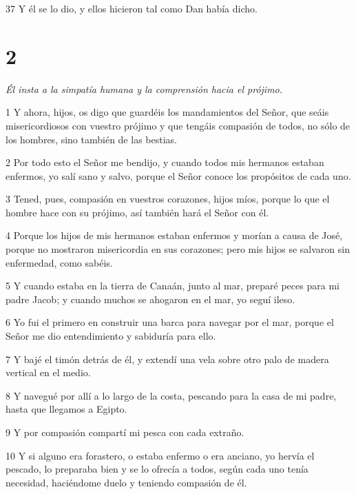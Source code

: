 \par 37 Y él se lo dio, y ellos hicieron tal como Dan había dicho.

\chapter{2}

\par \textit{Él insta a la simpatía humana y la comprensión hacia el prójimo.}

\par 1 Y ahora, hijos, os digo que guardéis los mandamientos del Señor, que seáis misericordiosos con vuestro prójimo y que tengáis compasión de todos, no sólo de los hombres, sino también de las bestias.

\par 2 Por todo esto el Señor me bendijo, y cuando todos mis hermanos estaban enfermos, yo salí sano y salvo, porque el Señor conoce los propósitos de cada uno.

\par 3 Tened, pues, compasión en vuestros corazones, hijos míos, porque lo que el hombre hace con su prójimo, así también hará el Señor con él.

\par 4 Porque los hijos de mis hermanos estaban enfermos y morían a causa de José, porque no mostraron misericordia en sus corazones; pero mis hijos se salvaron sin enfermedad, como sabéis.

\par 5 Y cuando estaba en la tierra de Canaán, junto al mar, preparé peces para mi padre Jacob; y cuando muchos se ahogaron en el mar, yo seguí ileso.

\par 6 Yo fui el primero en construir una barca para navegar por el mar, porque el Señor me dio entendimiento y sabiduría para ello.

\par 7 Y bajé el timón detrás de él, y extendí una vela sobre otro palo de madera vertical en el medio.

\par 8 Y navegué por allí a lo largo de la costa, pescando para la casa de mi padre, hasta que llegamos a Egipto.

\par 9 Y por compasión compartí mi pesca con cada extraño.

\par 10 Y si alguno era forastero, o estaba enfermo o era anciano, yo hervía el pescado, lo preparaba bien y se lo ofrecía a todos, según cada uno tenía necesidad, haciéndome duelo y teniendo compasión de él.


